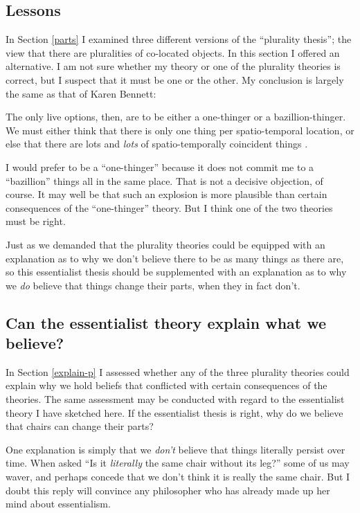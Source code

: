 \documentclass[11pt]{article}
\newenvironment{squote}{%
\begin{spacing}{1}
\begin{list}{}{%
\setlength{\labelwidth}{0pt}%
\rightmargin\leftmargin%
}
\item\relax
}{%
\end{list}%
\end{spacing}
}
\begin{document}
\begin{spacing}{1.5}
\section{Lessons}
\label{lessons-e}
In Section \ref{parts} I examined three different versions of the
``plurality thesis''; the view that there are pluralities of
co-located objects.  In this section I offered an alternative.  I am
not sure whether my theory or one of the plurality theories is
correct, but I suspect that it must be one or the other.  My
conclusion is largely the same as that of Karen Bennett:

\begin{squote}
The only live options, then, are to be either a one-thinger or a
bazillion-thinger.  We must either think that there is only one thing per
spatio-temporal location, or else that there are lots and \emph{lots} of
spatio-temporally coincident things \citeyearpar[358]{bennett2004}.
\end{squote}

I would prefer to be a ``one-thinger'' because it does not commit me
to a ``bazillion'' things all in the same place.  That is not a
decisive objection, of course.  It may well be that such an explosion
is more plausible than certain consequences of the ``one-thinger''
theory.  But I think one of the two theories must be right.

Just as we demanded that the plurality theories could be equipped with
an explanation as to why we don't believe there to be as many things
as there are, so this essentialist thesis should be supplemented with
an explanation as to why we {\em do} believe that things change their
parts, when they in fact don't.

\subsection{Can the essentialist theory explain what we believe?}
\label{explain-e}
In Section \ref{explain-p} I assessed whether any of the three
plurality theories could explain why we hold beliefs that conflicted
with certain consequences of the theories.  The same assessment may be
conducted with regard to the essentialist theory I have sketched here.
If the essentialist thesis is right, why do we believe that chairs can
change their parts?

One explanation is simply that we {\em don't} believe that things
literally persist over time.  When asked ``Is it {\em literally} the
same chair without its leg?'' some of us may waver, and perhaps
concede that we don't think it is really the same chair.  But I doubt
this reply will convince any philosopher who has already made up her
mind about essentialism.


\end{spacing}
\end{document}
